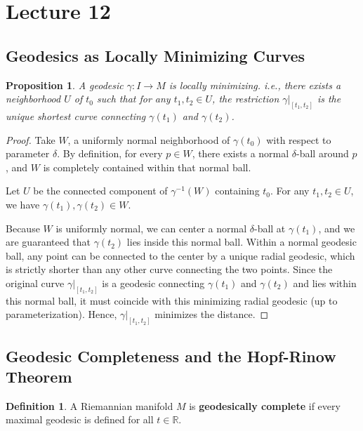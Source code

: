 \documentclass[11pt, a4paper]{article}
\theoremstyle{plain}
\newtheorem{proposition}[theorem]{Proposition}
\theoremstyle{definition}
\newtheorem{definition}[theorem]{Definition}
\theoremstyle{remark}
\begin{document}
\newpage
{

\section{Lecture 12}

\subsection{Geodesics as Locally Minimizing Curves}

\begin{proposition}
A geodesic $\gamma: I \to M$ is locally minimizing. i.e., there exists a neighborhood $U$ of $t_0$ such that for any $t_1, t_2 \in U$, the restriction $\gamma|_{[t_1, t_2]}$ is the unique shortest curve connecting $\gamma(t_1)$ and $\gamma(t_2)$.
\end{proposition}

\begin{proof}
Take $W$, a uniformly normal neighborhood of $\gamma(t_0)$ with respect to parameter $\delta$. By definition, for every $p \in W$, there exists a normal $\delta$-ball around $p$, and $W$ is completely contained within that normal ball.

Let $U$ be the connected component of $\gamma^{-1}(W)$ containing $t_0$. For any $t_1, t_2 \in U$, we have $\gamma(t_1), \gamma(t_2) \in W$. 

Because $W$ is uniformly normal, we can center a normal $\delta$-ball at $\gamma(t_1)$, and we are guaranteed that $\gamma(t_2)$ lies inside this normal ball. Within a normal geodesic ball, any point can be connected to the center by a unique radial geodesic, which is strictly shorter than any other curve connecting the two points. Since the original curve $\gamma|_{[t_1, t_2]}$ is a geodesic connecting $\gamma(t_1)$ and $\gamma(t_2)$ and lies within this normal ball, it must coincide with this minimizing radial geodesic (up to parameterization). Hence, $\gamma|_{[t_1, t_2]}$ minimizes the distance.
\end{proof}

\subsection{Geodesic Completeness and the Hopf-Rinow Theorem}

\begin{definition}
A Riemannian manifold $M$ is \textbf{geodesically complete} if every maximal geodesic is defined for all $t \in \mathbb{R}$.
\end{definition}

}
\end{document}
